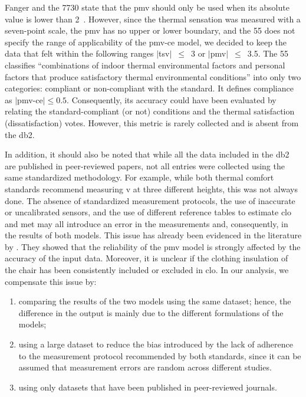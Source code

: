 Fanger and the \gls{7730} state that the \ac{pmv} should only be used when its absolute value is lower than 2~\cite{Fanger1970, iso7730}.
However, since the thermal sensation was measured with a seven-point scale, the \ac{pmv} has no upper or lower boundary, and the \gls{55} does not specify the range of applicability of the \ac{pmv-ce} model, we decided to keep the data that felt within the following ranges $|$\ac{tsv}$|$~$\leq$~\num{3} or $|$\ac{pmv}$|$~$\leq$~\num{3.5}. 
The \gls{55} classifies “combinations of indoor thermal environmental factors and personal factors that produce satisfactory thermal environmental conditions” into only two categories: compliant or non-compliant with the standard. 
It defines compliance as $\mid$\ac{pmv-ce}$\mid \leq 0.5$. Consequently, its accuracy could have been evaluated by relating the standard-compliant (or not) conditions and the thermal satisfaction (dissatisfaction) votes. 
However, this metric is rarely collected and is absent from the \ac{db2}. 

In addition, it should also be noted that while all the data included in the \ac{db2} are published in peer-reviewed papers, not all entries were collected using the same standardized methodology.
For example, while both thermal comfort standards recommend measuring \ac{v} at three different heights, this was not always done.
The absence of standardized measurement protocols, the use of inaccurate or uncalibrated sensors, and the use of different reference tables to estimate \ac{clo} and \ac{met} may all introduce an error in the measurements and, consequently, in the results of both models.
This issue has already been evidenced in the literature by .
They showed that the reliability of the \ac{pmv} model is strongly affected by the accuracy of the input data.
Moreover, it is unclear if the clothing insulation of the chair has been consistently included or excluded in \ac{clo}.
In our analysis, we compensate this issue by:
\begin{enumerate}[ {}1{)} ]
    \item comparing the results of the two models using the same dataset; hence, the difference in the output is mainly due to the different formulations of the models;
    \item using a large dataset to reduce the bias introduced by the lack of adherence to the measurement protocol recommended by both standards, since it can be assumed that measurement errors are random across different studies.
    \item using only datasets that have been published in peer-reviewed journals.
\end{enumerate}

